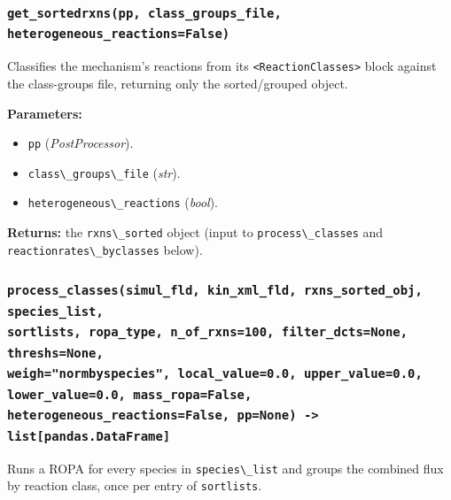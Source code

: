 \documentclass[11pt,a4paper]{report}
\newcommand{\pyfunc}[1]{\subsubsection{\texttt{#1}}}
\newcommand{\returns}{\vspace{2mm}\noindent\textbf{Returns:} }
\newenvironment{params}{\vspace{1mm}\noindent\textbf{Parameters:}\begin{itemize}[leftmargin=1.1cm,label={--},itemsep=1pt,topsep=2pt]}{\end{itemize}}
\newcommand{\pkg}[1]{\lstinline|#1|}
\begin{document}
\pyfunc{get\_sortedrxns(pp, class\_groups\_file, heterogeneous\_reactions=False)}

Classifies the mechanism's reactions from its \pkg{<ReactionClasses>} block
against the class-groups file, returning only the sorted/grouped object.

\begin{params}
\item \pkg{pp} (\textit{PostProcessor}).
\item \pkg{class\_groups\_file} (\textit{str}).
\item \pkg{heterogeneous\_reactions} (\textit{bool}).
\end{params}
\returns the \pkg{rxns\_sorted} object (input to \pkg{process\_classes} and
\pkg{reactionrates\_byclasses} below).

\pyfunc{process\_classes(simul\_fld, kin\_xml\_fld, rxns\_sorted\_obj, species\_list, \\ sortlists, ropa\_type, n\_of\_rxns=100, filter\_dcts=None, threshs=None, \\ weigh="normbyspecies", local\_value=0.0, upper\_value=0.0, lower\_value=0.0, mass\_ropa=False, heterogeneous\_reactions=False, pp=None) -> list[pandas.DataFrame]}

Runs a ROPA for every species in \pkg{species\_list} and groups the combined
flux by reaction class, once per entry of \pkg{sortlists}.
\end{document}
